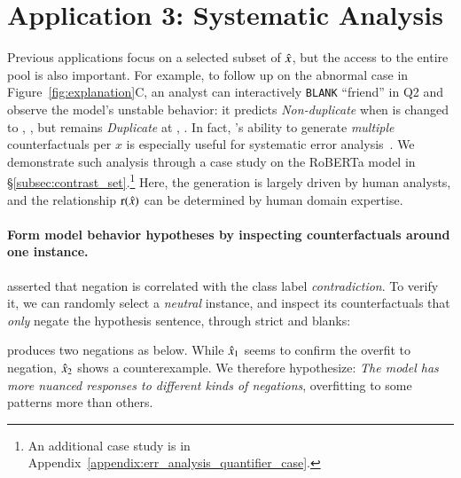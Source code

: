 \section{Application 3: Systematic Analysis}
\label{sec:app_err_analysis}

Previous applications focus on a selected subset of $\hat{x}$, but the access to the entire pool is also important.
For example, to follow up on the abnormal case in Figure~\ref{fig:explanation}C, an analyst can interactively \texttt{BLANK} ``friend'' in Q2 and observe the model's unstable behavior: it predicts \emph{Non-duplicate} when  is changed to , , but remains \emph{Duplicate} at , .
In fact, \sysname's ability to generate \emph{multiple} counterfactuals per $x$ is especially useful for systematic error analysis~\cite{wu2019errudite}.
We demonstrate such analysis through a case study on the \nli RoBERTa model in \S\ref{subsec:contrast_set}.\footnote{An additional case study is in Appendix~\ref{appendix:err_analysis_quantifier_case}.}
Here, the generation is largely driven by human analysts, and the relationship $\operatorname*{r}(\hat{x})$ can be determined by human domain expertise.

\paragraph{Form model behavior hypotheses by inspecting counterfactuals around one instance.}
\citet{gururangan2018annotation} asserted that negation is correlated with the class label \emph{contradiction}. 
To verify it, we can randomly select a \emph{neutral} instance, and inspect its counterfactuals that \emph{only} negate the hypothesis sentence, through strict \tagstrs and blanks: 


\sysname produces two negations as below.
While $\hat{x}_1$ seems to confirm the overfit to negation, $\hat{x}_2$ shows a counterexample. 
We therefore hypothesize: 
\emph{The model has more nuanced responses to different kinds of negations}, overfitting to some patterns more than others.

